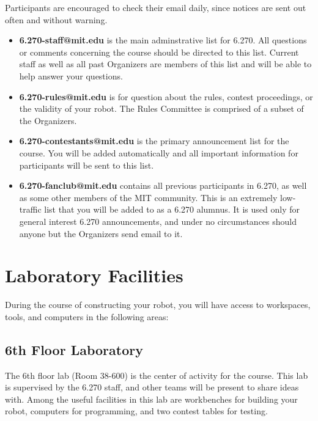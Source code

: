 Participants are encouraged to check their email daily, since notices are sent
out often and without warning.

\begin{itemize}

\item {\bf 6.270-staff@mit.edu} is the main adminstrative list
for 6.270. All questions or comments concerning the course should be
directed to this list. Current staff as well as all past Organizers
are members of this list and will be able to help answer your
questions.

\item {\bf 6.270-rules@mit.edu} is for
question about the rules, contest proceedings, or the validity of your
robot. The Rules Committee is comprised of a subset of the
Organizers.

\item {\bf 6.270-contestants@mit.edu} is the primary announcement
list for the course. You will be added automatically and all important
information for participants will be sent to this list.

\item {\bf 6.270-fanclub@mit.edu} contains all previous participants in 6.270,
as well as some other members of the MIT community. This is an extremely
low-traffic list that you will be added to as a 6.270 alumnus. It is used only
for general interest 6.270 announcements, and under no circumstances should
anyone but the Organizers send email to it.

\end{itemize}

\section{Laboratory Facilities}

During the course of constructing your robot, you will have access to
workspaces, tools, and computers in the following areas:

\subsection{6th Floor Laboratory}

The 6th floor lab (Room 38-600) is the center of activity for the
course. This lab is supervised by the 6.270 staff, and other teams
will be present to share ideas with. Among the useful facilities in
this lab are workbenches for building your robot, computers for
programming, and two contest tables for testing.

